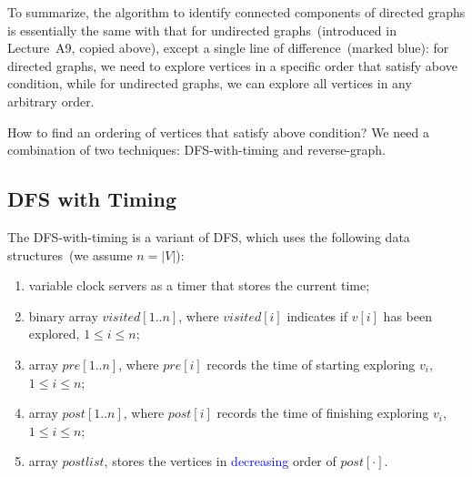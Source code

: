 \begin{minipage}{0.8\textwidth}
	\xxx
	\xxx
	\xxx
	\xxx
	\xxx
	\xxx
	\xxx
	\xxx
	\xxx
\end{minipage}

\begin{minipage}{0.8\textwidth}
	\xxx
	\xxx
	\xxx
	\xxx
	\xxx
	\xxx
\end{minipage}

To summarize, the algorithm to identify connected components of directed graphs
is essentially the same with that for undirected graphs~(introduced in Lecture~A9, copied above), 
except a single line of difference~(marked blue): for directed graphs,
we need to explore vertices in a specific order that satisfy above condition,
while for undirected graphs, we can explore all vertices in any arbitrary order.

How to find an ordering of vertices that satisfy above condition?
We need a combination of two techniques: DFS-with-timing and reverse-graph.



\subsection*{DFS with Timing}

The DFS-with-timing is a variant of DFS, which uses the following
data structures~(we assume $n = |V|$):

\vspace*{-\topsep}
\begin{enumerate}
\item variable clock servers as a timer that stores the current time;
\item binary array $visited[1..n]$, where $visited[i]$ indicates if $v[i]$ has been explored, $1 \le i \le n$;
\item array $pre[1..n]$, where $pre[i]$ records the time of starting exploring $v_i$, $1 \le i \le n$;
\item array $post[1..n]$, where $post[i]$ records the time of finishing exploring $v_i$, $1 \le i \le n$;
\item array $postlist$, stores the vertices in \textcolor{blue}{decreasing} order of $post[\cdot]$.
\end{enumerate}

